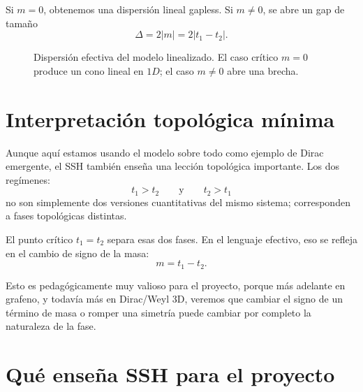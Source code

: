 Si \(m=0\), obtenemos una dispersión lineal gapless. Si \(m\neq 0\), se abre un gap de tamaño
\begin{equation}
\Delta = 2|m| = 2|t_1-t_2|.
\end{equation}

\begin{figure}[ht]
\centering
{}
\caption{Dispersión efectiva del modelo linealizado. El caso crítico \(m=0\) produce un cono lineal en \(1D\); el caso \(m\neq 0\) abre una brecha.}
\label{c01:fig:ssh-effective}
\end{figure}

\section{Interpretación topológica mínima}

Aunque aquí estamos usando el modelo sobre todo como ejemplo de Dirac emergente, el SSH también enseña una lección topológica importante. Los dos regímenes:
\begin{equation}
t_1>t_2
\qquad \text{y} \qquad
t_2>t_1
\end{equation}
no son simplemente dos versiones cuantitativas del mismo sistema; corresponden a fases topológicas distintas.

El punto crítico \(t_1=t_2\) separa esas dos fases. En el lenguaje efectivo, eso se refleja en el cambio de signo de la masa:
\begin{equation}
m=t_1-t_2.
\end{equation}

Esto es pedagógicamente muy valioso para el proyecto, porque más adelante en grafeno, y todavía más en Dirac/Weyl 3D, veremos que cambiar el signo de un término de masa o romper una simetría puede cambiar por completo la naturaleza de la fase.

\section{Qué enseña SSH para el proyecto}

